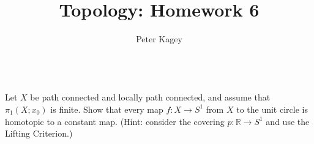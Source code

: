 \documentclass{article}
\newenvironment{problem}[2][Problem]{\begin{trivlist}
\item[\hskip \labelsep {\bfseries #1}\hskip \labelsep {\bfseries #2.}]}{\end{trivlist}}
\begin{document}
\title{Topology: Homework 6}
\author{Peter Kagey}

\maketitle

\begin{problem}{1} \text{} \\
  Let $X$ be path connected and locally path connected, and assume that
  $\pi_1(X; x_0)$ is finite. Show that every map $f\colon X\rightarrow S^1$
  from $X$ to the unit circle is homotopic to a constant map.
  (Hint: consider the covering $p\colon\mathbb R \rightarrow S^1$ and use the
  Lifting Criterion.)
\end{problem}
\end{document}
